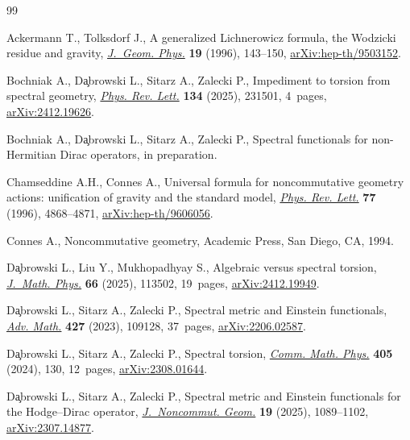 \begin{thebibliography}{99}
\footnotesize\itemsep=0pt

Ackermann T., Tolksdorf J., A generalized {L}ichnerowicz formula, the
 {W}odzicki residue and gravity,
 \href{https://doi.org/10.1016/0393-0440(95)00030-5}{\textit{J.~Geom. Phys.}}
 \textbf{19} (1996), 143--150,
 \href{http://arxiv.org/abs/hep-th/9503152}{arXiv:hep-th/9503152}.

Bochniak A., D\c{a}browski L., Sitarz A., Zalecki P., Impediment to torsion
 from spectral geometry,
 \href{https://doi.org/10.1103/drdl-l2mp}{\textit{Phys. Rev. Lett.}}
 \textbf{134} (2025), 231501, 4~pages,
 \href{http://arxiv.org/abs/2412.19626}{arXiv:2412.19626}.

Bochniak A., D\c{a}browski L., Sitarz A., Zalecki P., Spectral functionals for
 non-{H}ermitian {D}irac operators, {i}n preparation.

Chamseddine A.H., Connes A., Universal formula for noncommutative geometry
 actions: unification of gravity and the standard model,
 \href{https://doi.org/10.1103/PhysRevLett.77.4868}{\textit{Phys. Rev. Lett.}}
 \textbf{77} (1996), 4868--4871,
 \href{http://arxiv.org/abs/hep-th/9606056}{arXiv:hep-th/9606056}.

Connes A., Noncommutative geometry, Academic Press, San Diego, CA, 1994.

D\c{a}browski L., Liu Y., Mukhopadhyay S., Algebraic versus spectral torsion,
 \href{https://doi.org/10.1063/5.0281331}{\textit{J.~Math. Phys.}} \textbf{66}
 (2025), 113502, 19~pages,
 \href{http://arxiv.org/abs/2412.19949}{arXiv:2412.19949}.

D\c{a}browski L., Sitarz A., Zalecki P., Spectral metric and {E}instein
 functionals, \href{https://doi.org/10.1016/j.aim.2023.109128}{\textit{Adv.
 Math.}} \textbf{427} (2023), 109128, 37~pages,
 \href{http://arxiv.org/abs/2206.02587}{arXiv:2206.02587}.

D\c{a}browski L., Sitarz A., Zalecki P., Spectral torsion,
 \href{https://doi.org/10.1007/s00220-024-04950-7}{\textit{Comm. Math. Phys.}}
 \textbf{405} (2024), 130, 12~pages,
 \href{http://arxiv.org/abs/2308.01644}{arXiv:2308.01644}.

D\c{a}browski L., Sitarz A., Zalecki P., Spectral metric and {E}instein
 functionals for the {H}odge--{D}irac operator,
 \href{https://doi.org/10.4171/jncg/573}{\textit{J.~Noncommut. Geom.}}
 \textbf{19} (2025), 1089--1102,
 \href{http://arxiv.org/abs/2307.14877}{arXiv:2307.14877}.


\end{thebibliography}

